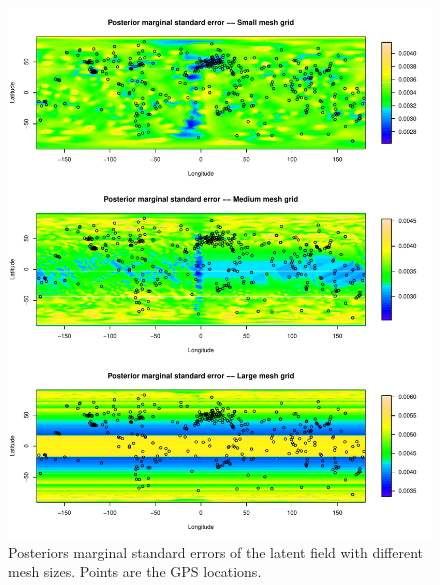 \documentclass[a4paper,12pt]{article}
\begin{document}
 \begin{figure}[htbp]
 \begin{center}
 \includegraphics[scale=0.8]{fig/MeshSize_1GIAfield.pdf}
 \end{center}
 \caption[Posterior marginals of the latent field from different mesh size]{Posteriors marginal standard errors of the latent field with different mesh sizes. Points are the GPS locations.}
 \label{fig:4}
 \end{figure}
 















%
\end{document}
